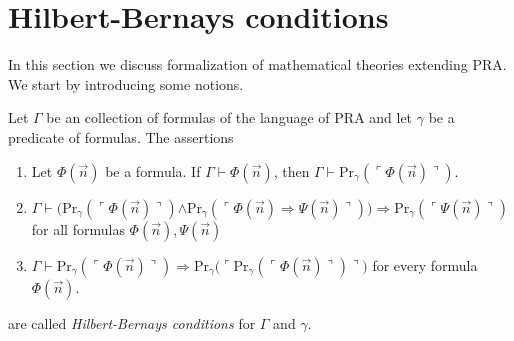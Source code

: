 \documentclass[10pt]{amsart}
\newcommand{\godel}[1]{\ulcorner #1 \urcorner}
\newcommand{\mra}{\boldsymbol{\Rightarrow}}
\newcommand{\mand}{\boldsymbol{\wedge}}
\begin{document}
\section{Hilbert-Bernays conditions}
\noindent
In this section we discuss formalization of mathematical theories extending $\mathrm{PRA}$. We start by introducing some notions.

\begin{definition}
	Let $\Gamma$ be an collection of formulas of the language of $\mathrm{PRA}$ and let $\gamma$ be a predicate of formulas. The assertions
	\begin{enumerate}[label=\textbf{HB\arabic*.}, leftmargin=3.0em]
		\item Let $\Phi(\vec{n})$ be a formula. If $\Gamma\vdash \Phi(\vec{n})$, then $\Gamma \vdash \mathrm{Pr}_{\gamma}\left(\godel{\Phi(\vec{n})}\right)$.
		\item $\Gamma \vdash \big(\mathrm{Pr}_{\gamma}\left(\godel{\Phi(\vec{n})}\right) \mand \mathrm{Pr}_{\gamma}\left(\godel{\Phi(\vec{n}) \mra \Psi(\vec{n})}\right)\big)\mra \mathrm{Pr}_{\gamma}\left(\godel{\Psi(\vec{n})}\right)$ for all formulas $\Phi(\vec{n}),\Psi(\vec{n})$
		\item $\Gamma \vdash \mathrm{Pr}_{\gamma}\left(\godel{\Phi(\vec{n})}\right) \mra \mathrm{Pr}_{\gamma}\bigg(\godel{\mathrm{Pr}_{\gamma}(\godel{\Phi(\vec{n})})}\bigg)$ for every formula $\Phi(\vec{n})$.
	\end{enumerate}
	are called \textit{Hilbert-Bernays conditions} for $\Gamma$ and $\gamma$.
\end{definition}
\end{document}
